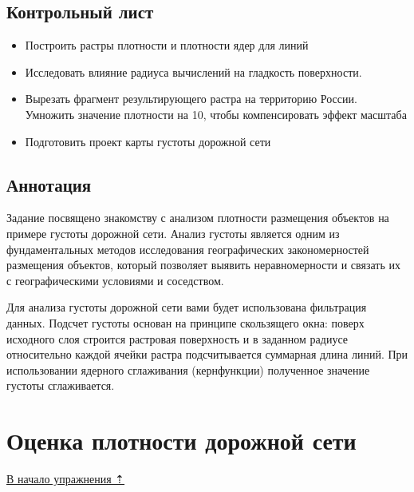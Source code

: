 \documentclass[12pt,]{book}
\providecommand{\tightlist}{%
  \setlength{\itemsep}{0pt}\setlength{\parskip}{0pt}}
\begin{document}
\hypertarget{density-analysis-control}{%
\subsection{Контрольный лист}\label{density-analysis-control}}

\begin{itemize}
\tightlist
\item
  Построить растры плотности и плотности ядер для линий
\item
  Исследовать влияние радиуса вычислений на гладкость поверхности.
\item
  Вырезать фрагмент результирующего растра на территорию России. Умножить значение плотности на 10, чтобы компенсировать эффект масштаба
\item
  Подготовить проект карты густоты дорожной сети
\end{itemize}

\hypertarget{density-analysis-annotation}{%
\subsection{Аннотация}\label{density-analysis-annotation}}

Задание посвящено знакомству с анализом плотности размещения объектов на примере густоты дорожной сети. Анализ густоты является одним из фундаментальных методов исследования географических закономерностей размещения объектов, который позволяет выявить неравномерности и связать их с географическими условиями и соседством.

Для анализа густоты дорожной сети вами будет использована фильтрация данных. Подсчет густоты основан на принципе скользящего окна: поверх исходного слоя строится растровая поверхность и в заданном радиусе относительно каждой ячейки растра подсчитывается суммарная длина линий. При использовании ядерного сглаживания (кернфункции) полученное значение густоты сглаживается.

\hypertarget{density-analysis-estimation}{%
\section{Оценка плотности дорожной сети}\label{density-analysis-estimation}}

\protect\hyperlink{density-analysis}{В начало упражнения ⇡}
\end{document}
